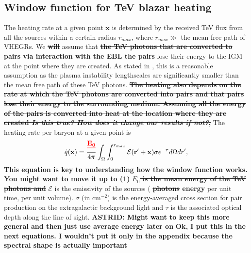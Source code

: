 \documentclass[twocolumns]{emulateapj}
\newcommand\ALc[1]{{\color{red} \bf #1}} %
\newcommand\Pc[1]{{\color{cyan} \bf #1}} %
\begin{document}
\ALc{\subsection{Window function for TeV blazar heating}}
The heating rate at a given point $\mathbf{x}$ is determined by the received TeV flux from all the sources within a certain radius $r_{max}$, where $r_{max} \gg $ the mean free path of VHEGRs. We \ALc{\sout{will}} assume that \ALc{\sout{ the TeV photons that are converted to pairs via interaction with the EBL} the pairs} lose their energy to the IGM at the point where they are created.  As stated in \citet{2012ApJ...752...22B}, this is a reasonable assumption as the plasma instability lengthscales are significantly smaller than the mean free path of these TeV photons. \ALc{\sout{ The heating also depends on the rate at which the TeV photons are converted into pairs and that pairs lose their energy to the surrounding medium.  Assuming all the energy of the pairs is converted into heat at the location where they are created \textit{Is this true? How does it change our results if not?}, }}
The heating rate per baryon at a given point is
\begin{equation}
\label{eq:heating_rate}
  \dot{q}(\mathbf{x})= \frac{\ALc{\sout{E_0}}}{4\pi}  \int_{\Omega}\int_0^{r_{max}}   \mathcal{E}(\mathbf{r}'+\mathbf{x})\sigma  e^{-\tau}d\Omega dr' ,
\end{equation}
\Pc{This equation is key to understanding how the window function works.  You might want to move it up to (1)}
\ALc{\sout {$E_0$ is the mean energy of the TeV photons and }}  $\mathcal{E}$ is the emissivity of the sources (\ALc{\sout{photons} energy} per unit time, per unit volume). $\sigma$ (in cm$^{-2}$) is the energy-averaged cross section for pair production on the extragalactic background light and $\tau$ is the associated optical depth along the line of sight. %
\Pc{ASTRID: Might want to keep this more general and then just use average energy later on}
\ALc{Ok, I put this in the next equations. I wouldn't put it only in the appendix because the spectral shape is actually important}
\end{document}
